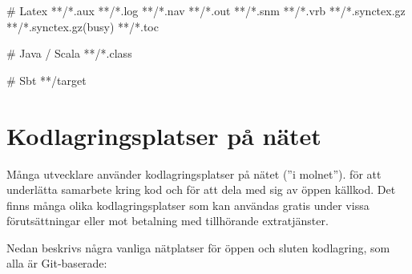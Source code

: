 \begin{itemize}[leftmargin=*]
\begin{Code}[language=]
# Latex
**/*.aux
**/*.log
**/*.nav
**/*.out
**/*.snm
**/*.vrb
**/*.synctex.gz
**/*.synctex.gz(busy)
**/*.toc

# Java / Scala
**/*.class

# Sbt
**/target

\end{Code} 


\end{itemize}
 

\clearpage 
  
\section{Kodlagringsplatser på nätet}\label{section:code-hosting}

Många utvecklare använder kodlagringsplatser på nätet (''i molnet'').  för att underlätta samarbete kring kod och för att dela med sig av öppen källkod. Det finns många olika kodlagringsplatser som kan användas gratis under vissa förutsättningar eller mot betalning med tillhörande extratjänster. 

Nedan beskrivs några vanliga nätplatser för öppen och sluten kodlagring, som alla är Git-baserade:

